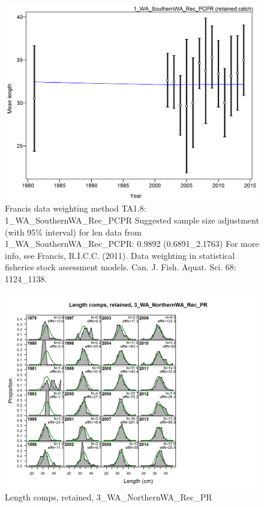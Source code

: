 \documentclass[12pt,]{article}
\begin{document}
\begin{figure}[htbp]
\centering
\includegraphics{./r4ss/plots_mod1/comp_lenfit_data_weighting_TA1.8_1_WA_SouthernWA_Rec_PCPR.png}
\caption{Francis data weighting method TA1.8:
1\_WA\_SouthernWA\_Rec\_PCPR Suggested sample size adjustment (with 95\%
interval) for len data from 1\_WA\_SouthernWA\_Rec\_PCPR: 0.9892
(0.6891\_2.1763) For more info, see Francis, R.I.C.C. (2011). Data
weighting in statistical fisheries stock assessment models. Can. J.
Fish. Aquat. Sci. 68: 1124\_1138.
\label{fig:mod1_4_comp_lenfit_data_weighting_TA1.8_1_WA_SouthernWA_Rec_PCPR}}
\end{figure}

\begin{figure}[htbp]
\centering
\includegraphics{./r4ss/plots_mod1/comp_lenfit_flt3mkt2.png}
\caption{Length comps, retained, 3\_WA\_NorthernWA\_Rec\_PR
\label{fig:mod1_5_comp_lenfit_flt3mkt2}}
\end{figure}
\end{document}
